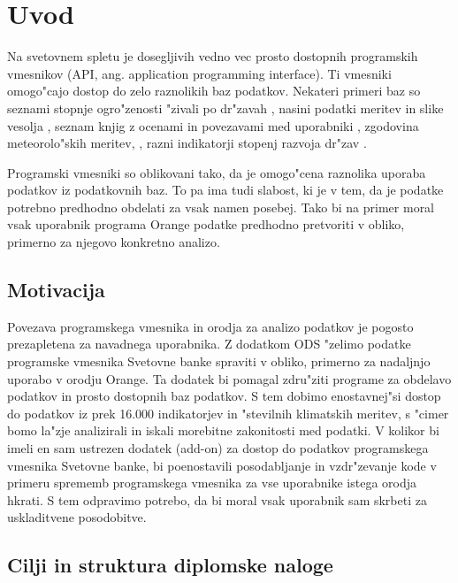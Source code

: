 
\chapter{Uvod}

Na svetovnem spletu je dosegljivih vedno vec prosto dostopnih programskih
vmesnikov (API, ang. application programming interface). Ti vmesniki omogo"cajo dostop
do zelo raznolikih baz podatkov. Nekateri primeri baz so                          
seznami stopnje ogro"zenosti "zivali po dr"zavah ,    
nasini podatki meritev in slike vesolja  ,
seznam knjig z ocenami in povezavami med uporabniki ,
zgodovina meteorolo"skih meritev, ,
razni indikatorji stopenj razvoja dr"zav .

Programski vmesniki so oblikovani tako, da je omogo"cena raznolika uporaba 
podatkov iz podatkovnih baz. To pa ima tudi slabost, ki je v tem, da je podatke 
potrebno predhodno obdelati za vsak namen posebej. Tako bi na primer moral vsak
uporabnik programa Orange podatke predhodno pretvoriti v obliko, primerno za 
njegovo konkretno analizo.


\section{Motivacija}

Povezava programskega vmesnika in orodja za analizo podatkov je pogosto    
prezapletena za navadnega uporabnika. Z dodatkom ODS "zelimo podatke
programske vmesnika Svetovne banke spraviti v obliko, primerno za nadaljnjo 
uporabo v orodju Orange. Ta dodatek bi pomagal zdru"ziti programe za obdelavo 
podatkov in prosto dostopnih baz podatkov. S tem dobimo enostavnej"si dostop do
podatkov iz prek 16.000 indikatorjev in "stevilnih klimatskih meritev, 
s "cimer bomo la"zje analizirali in iskali morebitne zakonitosti med podatki.
V kolikor bi imeli en sam ustrezen dodatek (add-on) za dostop do podatkov 
programskega vmesnika Svetovne banke, bi poenostavili posodabljanje in 
vzdr"zevanje kode v primeru sprememb programskega vmesnika za vse uporabnike
istega orodja hkrati. S tem odpravimo potrebo, da bi moral vsak uporabnik sam
skrbeti za uskladitvene posodobitve.


\section{Cilji in struktura diplomske naloge}

